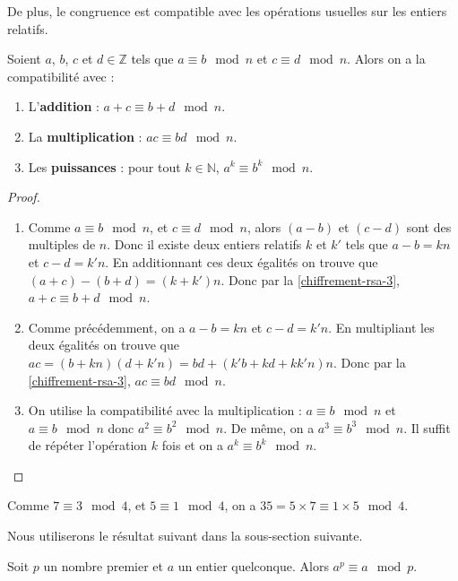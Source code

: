   De plus, le congruence est compatible avec les opérations usuelles sur les entiers relatifs.

  \begin{theorem}
    Soient $a$, $b$, $c$ et $d \in \mathbb{Z}$ tels que $a \equiv b \mod n$ et $c \equiv d \mod n$. Alors on a la compatibilité avec :
    \begin{enumerate}[label={\bfseries(\roman*)}]
      \item L'\textbf{addition} : $a + c \equiv b + d \mod n$.
      \item La \textbf{multiplication} : $ac \equiv bd \mod n$.
      \item Les \textbf{puissances} : pour tout $k \in \mathbb{N}$, $a^k \equiv b^k \mod n$.
    \end{enumerate}
  \end{theorem}

  \begin{proof}
    \begin{enumerate}[label={\bfseries(\roman*)}]
      \item Comme $a \equiv b \mod n$, et $c \equiv d \mod n$, alors $(a-b)$ et $(c-d)$ sont des multiples de $n$. Donc il existe deux entiers relatifs $k$ et $k'$ tels que $a-b = kn$ et $c-d = k'n$. En additionnant ces deux égalités on trouve que $(a+c) - (b+d) = (k+k')n$. Donc par la \cref{chiffrement-rsa-3}, $a + c \equiv b + d \mod n$.
      \item Comme précédemment, on a $a-b = kn$ et $c-d = k'n$. En multipliant les deux égalités on trouve que $ac = (b+kn)(d+k'n) = bd + (k'b + kd + kk'n)n$. Donc par la \cref{chiffrement-rsa-3}, $ac \equiv bd \mod n$.
      \item On utilise la compatibilité avec la multiplication : $a \equiv b \mod n$ et $a \equiv b \mod n$ donc $a^2 \equiv b^2 \mod n$. De même, on a $a^3 \equiv b^3 \mod n$. Il suffit de répéter l'opération $k$ fois et on a $a^k \equiv b^k \mod n$.
    \end{enumerate}
  \end{proof}

  \begin{example}
    Comme $7 \equiv 3 \mod 4$, et $5 \equiv 1 \mod 4$, on a $35 = 5 \times 7 \equiv 1 \times 5 \mod 4$.
  \end{example}

  Nous utiliserons le résultat suivant dans la sous-section suivante.

  \begin{theorem}
    \label{chiffrement-rsa-5}
    Soit $p$ un nombre premier et $a$ un entier quelconque. Alors $a^p \equiv a \mod p$.
  \end{theorem}


